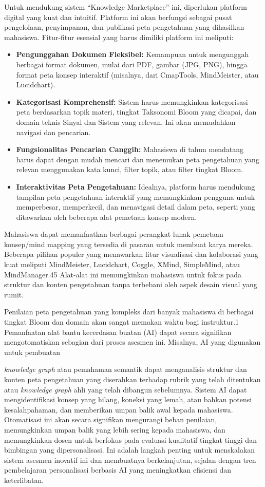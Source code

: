 \documentclass[
  letterpaper,
  DIV=11,
  numbers=noendperiod]{scrreprt}
\begin{document}
Untuk mendukung sistem ``Knowledge Marketplace'' ini, diperlukan
platform digital yang kuat dan intuitif. Platform ini akan berfungsi
sebagai pusat pengelolaan, penyimpanan, dan publikasi peta pengetahuan
yang dihasilkan mahasiswa. Fitur-fitur esensial yang harus dimiliki
platform ini meliputi:

\begin{itemize}
\item
  \textbf{Pengunggahan Dokumen Fleksibel:} Kemampuan untuk mengunggah
  berbagai format dokumen, mulai dari PDF, gambar (JPG, PNG), hingga
  format peta konsep interaktif (misalnya, dari CmapTools, MindMeister,
  atau Lucidchart).
\item
  \textbf{Kategorisasi Komprehensif:} Sistem harus memungkinkan
  kategorisasi peta berdasarkan topik materi, tingkat Taksonomi Bloom
  yang dicapai, dan domain teknis Sinyal dan Sistem yang relevan. Ini
  akan memudahkan navigasi dan pencarian.
\item
  \textbf{Fungsionalitas Pencarian Canggih:} Mahasiswa di tahun
  mendatang harus dapat dengan mudah mencari dan menemukan peta
  pengetahuan yang relevan menggunakan kata kunci, filter topik, atau
  filter tingkat Bloom.
\item
  \textbf{Interaktivitas Peta Pengetahuan:} Idealnya, platform harus
  mendukung tampilan peta pengetahuan interaktif yang memungkinkan
  pengguna untuk memperbesar, memperkecil, dan menavigasi detail dalam
  peta, seperti yang ditawarkan oleh beberapa alat pemetaan konsep
  modern.
\end{itemize}

Mahasiswa dapat memanfaatkan berbagai perangkat lunak pemetaan
konsep/mind mapping yang tersedia di pasaran untuk membuat karya mereka.
Beberapa pilihan populer yang menawarkan fitur visualisasi dan
kolaborasi yang kuat meliputi MindMeister, Lucidchart, Coggle, XMind,
SimpleMind, atau MindManager.45 Alat-alat ini memungkinkan mahasiswa
untuk fokus pada struktur dan konten pengetahuan tanpa terbebani oleh
aspek desain visual yang rumit.

Penilaian peta pengetahuan yang kompleks dari banyak mahasiswa di
berbagai tingkat Bloom dan domain akan sangat memakan waktu bagi
instruktur.1 Pemanfaatan alat bantu kecerdasan buatan (AI) dapat secara
signifikan mengotomatiskan sebagian dari proses asesmen ini. Misalnya,
AI yang digunakan untuk pembuatan

\emph{knowledge graph} atau pemahaman semantik dapat menganalisis
struktur dan konten peta pengetahuan yang diserahkan terhadap rubrik
yang telah ditentukan atau \emph{knowledge graph} ahli yang telah
dibangun sebelumnya. Sistem AI dapat mengidentifikasi konsep yang
hilang, koneksi yang lemah, atau bahkan potensi kesalahpahaman, dan
memberikan umpan balik awal kepada mahasiswa. Otomatisasi ini akan
secara signifikan mengurangi beban penilaian, memungkinkan umpan balik
yang lebih sering kepada mahasiswa, dan memungkinkan dosen untuk
berfokus pada evaluasi kualitatif tingkat tinggi dan bimbingan yang
dipersonalisasi. Ini adalah langkah penting untuk menskalakan sistem
asesmen inovatif ini dan membuatnya berkelanjutan, sejalan dengan tren
pembelajaran personalisasi berbasis AI yang meningkatkan efisiensi dan
keterlibatan.
\end{document}
